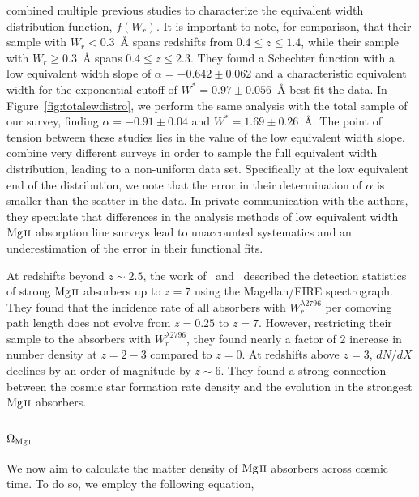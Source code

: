 \documentclass[iop,apj,numberedappendix,appendixfloats,twocolappendix]{emulateapj}
\begin{document}
\cite{Kacprzak2011MgII} combined multiple previous studies to characterize the equivalent width distribution function, $f(W_r)$. It is important to note, for comparison, that their sample with $W_r < 0.3$~{\AA} spans redshifts from $0.4 \le z \le 1.4$, while their sample with $W_r \ge 0.3$~{\AA} spans $0.4 \le z \le 2.3$. They found a Schechter function with a low equivalent width slope of $\alpha = -0.642 \pm 0.062$ and a characteristic equivalent width for the exponential cutoff of $W^* = 0.97 \pm 0.056$~{\AA} best fit the data. In Figure~\ref{fig:totalewdistro}, we perform the same analysis with the total sample of our survey, finding $\alpha = -0.91 \pm 0.04$ and $W^* = 1.69 \pm 0.26$~{\AA}. The point of tension between these studies lies in the value of the low equivalent width slope. \cite{Kacprzak2011MgII} combine very different surveys in order to sample the full equivalent width distribution, leading to a non-uniform data set. Specifically at the low equivalent end of the distribution, we note that the error in their determination of $\alpha$ is smaller than the scatter in the data. In private communication with the authors, they speculate that differences in the analysis methods of low equivalent width ${\hbox{{\rm Mg}\kern 0.1em{\sc ii}}}$ absorption line surveys lead to unaccounted systematics and an underestimation of the error in their functional fits. 

At redshifts beyond $z \sim 2.5$, the work of~\cite{Matejek2012,Matejek2013} and~\cite{Chen2016} described the detection statistics of strong ${\hbox{{\rm Mg}\kern 0.1em{\sc ii}}}$ absorbers up to $z = 7$ using the Magellan/FIRE spectrograph. They found that the incidence rate of all absorbers with $W_r^{\lambda2796}$ per comoving path length does not evolve from $z = 0.25$ to $z = 7$. However, restricting their sample to the absorbers with $W_r^{\lambda2796}$, they found nearly a factor of 2 increase in number density at $z = 2-3$ compared to $z = 0$. At redshifts above $z = 3$, $dN\!/dX$ declines by an order of magnitude by $z \sim 6$. They found a strong connection between the cosmic star formation rate density and the evolution in the strongest ${\hbox{{\rm Mg}\kern 0.1em{\sc ii}}}$ absorbers.

\subsection{$\Omega_{\hbox{\scriptsize {\MgII}}}$}
\label{omegamgii}

We now aim to calculate the matter density of ${\hbox{{\rm Mg}\kern 0.1em{\sc ii}}}$ absorbers across cosmic time. To do so, we employ the following equation,
\end{document}

